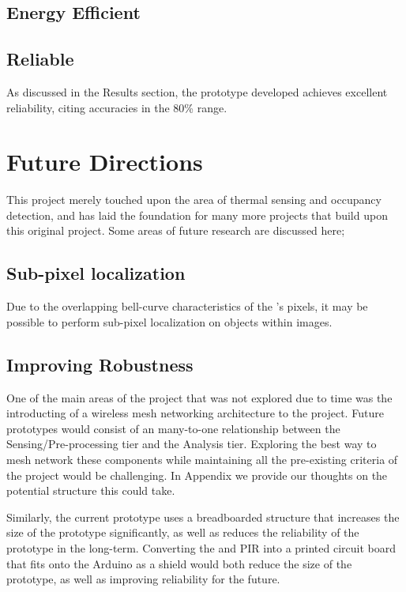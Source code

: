 \documentclass[../thesis/thesis.tex]{subfiles}
\begin{document}
\subsection{Energy Efficient}


\subsection{Reliable}
As discussed in the Results section, the prototype developed achieves excellent reliability, citing accuracies in the 80\% range. 


\section{Future Directions}
This project merely touched upon the area of thermal sensing and occupancy detection, and has laid the foundation for many more projects that build upon this original project. Some areas of future research are discussed here;

\subsection{Sub-pixel localization}
Due to the overlapping bell-curve characteristics of the \mlx's pixels, it may be possible to perform sub-pixel localization on objects within images. %

\subsection{Improving Robustness}
One of the main areas of the project that was not explored due to time was the introducting of a wireless mesh networking architecture to the project. Future prototypes would consist of an many-to-one relationship between the Sensing/Pre-processing tier and the Analysis tier. Exploring the best way to mesh network these components while maintaining all the pre-existing criteria of the project would be challenging. In Appendix  we provide our thoughts on the potential structure this could take.

Similarly, the current prototype uses a breadboarded structure that increases the size of the prototype significantly, as well as reduces the reliability of the prototype in the long-term. Converting the \mlx and PIR into a printed circuit board that fits onto the Arduino as a shield would both reduce the size of the prototype, as well as improving reliability for the future.
\end{document}
